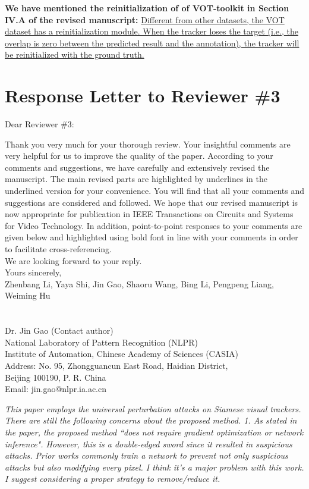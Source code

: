 \documentclass[12pt]{article}
\begin{document}
\textbf{We have mentioned the reinitialization of of VOT-toolkit in Section IV.A of the revised manuscript:}
\uline{Different from other datasets, the VOT dataset has a reinitialization module. When the tracker loses the target (i.e., the overlap is zero between the predicted result and the annotation), the tracker will be reinitialized with the ground truth.}

\clearpage
\newpage
{\centering\section*{Response Letter to Reviewer \#3}}
\noindent Dear Reviewer \#3:

Thank you very much for your thorough review. Your insightful comments are very helpful for us to improve the quality of the paper. According to your comments and suggestions, we have carefully and extensively revised the manuscript. The main revised parts are highlighted by underlines in the underlined version for your convenience. You will find that all your comments and suggestions are considered and followed. We hope that our revised manuscript is now appropriate for publication in IEEE Transactions on Circuits and Systems for Video Technology.
In addition, point-to-point responses to your comments are given below and highlighted using bold font in line with your comments in order to facilitate cross-referencing.\\[10pt]
\indent We are looking forward to your reply.\\[10pt]
\noindent Yours sincerely,\\
\noindent Zhenbang Li, Yaya Shi, Jin Gao, Shaoru Wang, Bing Li, Pengpeng Liang, Weiming Hu
\\
\\
\\
\noindent Dr. Jin Gao (Contact author)\\
\noindent National Laboratory of Pattern Recognition (NLPR)\\
\noindent Institute of Automation, Chinese Academy of Sciences (CASIA)\\
\noindent Address: No. 95, Zhongguancun East Road, Haidian District,\\
\noindent Beijing 100190, P. R. China\\
\noindent Email: jin.gao@nlpr.ia.ac.cn

\newpage

\textit{This paper employs the universal perturbation attacks on Siamese visual trackers. There are still the following concerns about the proposed method. 1. As stated in the paper, the proposed method ``does not require gradient optimization or network inference". However, this is a double-edged sword since it resulted in suspicious attacks. Prior works commonly train a network to prevent not only suspicious attacks but also modifying every pixel. I think it's a major problem with this work. I suggest considering a proper strategy to remove/reduce it.}
\end{document}
